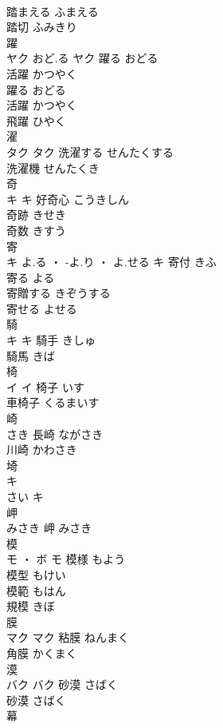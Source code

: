 \documentclass[8pt]{extreport}
\begin{document}
\begin{CJK}{UTF8}{min}
\\	踏まえる	ふまえる	
\\	踏切	ふみきり	
\\	躍	
\\	ヤク	おど.る	ヤク	躍る	おどる	
\\	活躍	かつやく	
\\	躍る	おどる	
\\	活躍	かつやく	
\\	飛躍	ひやく	
\\	濯	
\\	タク		タク	洗濯する	せんたくする	
\\	洗濯機	せんたくき	
\\	奇	
\\	キ		キ	好奇心	こうきしん	
\\	奇跡	きせき	
\\	奇数	きすう	
\\	寄	
\\	キ	よ.る ・ -よ.り ・ よ.せる	キ	寄付	きふ	
\\	寄る	よる	
\\	寄贈する	きぞうする	
\\	寄せる	よせる	
\\	騎	
\\	キ		キ	騎手	きしゅ	
\\	騎馬	きば	
\\	椅	
\\	イ		イ	椅子	いす	
\\	車椅子	くるまいす	
\\	崎	
\\	さき														長崎	ながさき	
\\	川崎	かわさき	
\\	埼	
\\	キ
\\	さい	キ
\\	岬	
\\	みさき														岬	みさき	
\\	模	
\\	モ ・ ボ		モ	模様	もよう	
\\	模型	もけい	
\\	模範	もはん	
\\	規模	きぼ	
\\	膜	
\\	マク		マク	粘膜	ねんまく	
\\	角膜	かくまく	
\\	漠	
\\	バク		バク	砂漠	さばく	
\\	砂漠	さばく	
\\	幕	

\end{CJK}
\end{document}
